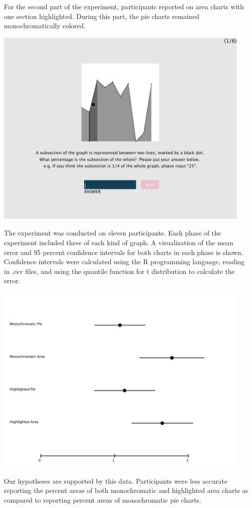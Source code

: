 \documentclass[12pt]{article}
\begin{document}
For the second part of the experiment, participants reported on area charts with one section highlighted.  During this part, the pie charts remained monochromatically colored.
\begin{center}
\includegraphics[width=5in]{shaded_area.png}
\end{center}
The experiment was conducted on eleven participants.  Each phase of the experiment included three of each kind of graph.  A visualization of the mean error and 95 percent confidence intervals for both charts in each phase is shown.  Confidence intervals were calculated using the R programming language, reading in .csv files, and using the quantile function for t distribution to calculate the error.
\begin{center}
\includegraphics[width=5in]{confidence_intervals.png}
\end{center}
Our hypotheses are supported by this data.  Participants were less accurate reporting the percent areas of both monochromatic and highlighted area charts as compared to reporting percent areas of monochromatic pie charts.
\end{document}
